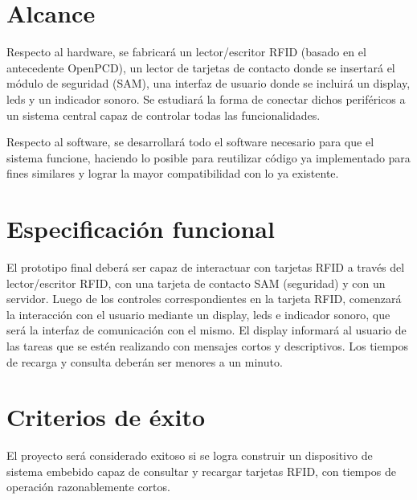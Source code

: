 \section{Alcance}

Respecto al hardware, se fabricará un lector/escritor RFID (basado en el antecedente OpenPCD), un lector de tarjetas de contacto donde se insertará el módulo de seguridad (SAM), una interfaz de usuario donde se incluirá un display, leds y  un indicador sonoro. Se estudiará la forma de conectar dichos periféricos a un sistema central capaz de controlar todas las funcionalidades.

\bigskip
Respecto al software, se desarrollará todo el software necesario para que el sistema funcione, haciendo lo posible para reutilizar código ya implementado para fines similares y lograr la mayor compatibilidad con lo ya existente.


\section{Especificación funcional}

El prototipo final deberá ser capaz de interactuar con tarjetas RFID a través del \\
lector/escritor RFID, con una tarjeta de contacto SAM (seguridad) y con un servidor. Luego de los controles correspondientes en la tarjeta RFID, comenzará la interacción con el usuario mediante un display, leds e indicador sonoro, que será la interfaz de comunicación con el mismo. El display informará al usuario de las tareas que se estén realizando con mensajes cortos y descriptivos. Los tiempos de recarga y consulta deberán ser menores a un minuto.


\section{Criterios de éxito}

El proyecto será considerado exitoso si se logra construir un dispositivo de sistema embebido capaz de consultar y recargar tarjetas RFID, con tiempos de operación razonablemente cortos.